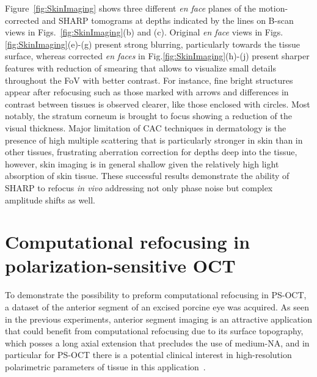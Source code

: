 Figure~\ref{fig:SkinImaging} shows three different \textit{en face} planes of the motion-corrected and SHARP tomograms at depths indicated by the lines on B-scan views in Figs.~\ref{fig:SkinImaging}(b) and (c). Original \textit{en face} views in Figs.\ref{fig:SkinImaging}(e)-(g) present strong blurring, particularly towards the tissue surface, whereas corrected \textit{en faces} in Fig.\ref{fig:SkinImaging}(h)-(j) present sharper features with reduction of smearing that allows to visualize small details throughout the FoV with better contrast. For instance, fine bright structures appear after refocusing such as those marked with arrows and differences in contrast between tissues is observed clearer, like those  enclosed with circles. Most notably, the stratum corneum is brought to focus showing a reduction of the visual thickness. Major limitation of CAC techniques in dermatology is the presence of high multiple scattering that is particularly stronger in skin than in other tissues, frustrating aberration correction for depths deep into the tissue, however, skin imaging is in general shallow given the relatively high light absorption of skin tissue. These successful results demonstrate the ability of SHARP to refocus \textit{in vivo} addressing not only phase noise but complex amplitude shifts as well.

\section{Computational refocusing in polarization-sensitive OCT}

To demonstrate the possibility to preform computational refocusing in PS-OCT, a dataset of the anterior segment of an excised porcine eye was acquired. As seen in the previous experiments, anterior segment imaging is an attractive application that could benefit from computational refocusing due to its surface topography, which posses a long axial extension that precludes the use of medium-NA, and in particular for PS-OCT there is a potential clinical interest in high-resolution polarimetric parameters of tissue in this application~\cite{Li2020_Vectorial}.

